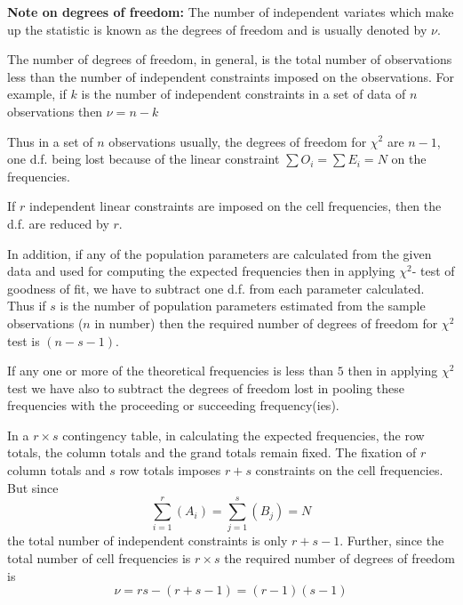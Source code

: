 \documentclass[oneside,11pt,pdftex]{book}%
\numberwithin{equation}{section}
\numberwithin{section}{chapter}
\numberwithin{equation}{chapter}
\begin{document}
\textbf{Note on degrees of freedom:} The number of independent variates which make up the statistic is known as the degrees of freedom and is usually denoted by $ \nu $.

The number of degrees of freedom, in general, is the total number of observations less than the number of independent constraints imposed on the observations. For example, if $ k $ is the number of independent constraints in a set of data of $ n $ observations then $ \nu=n-k $

Thus in a set of $ n $ observations usually, the degrees of freedom for $ \chi^2 $ are $ n-1 $, one d.f. being lost because of the linear constraint $ \sum O_i=\sum E_i=N $ on the frequencies.

If $ r $ independent linear constraints are imposed on the cell frequencies, then the d.f. are reduced by $ r $.

In addition, if any of the population parameters are calculated from the given data and used for computing the expected frequencies then in applying $ \chi^2 $- test of goodness of fit, we have to subtract one d.f. from each parameter calculated. Thus if $ s $ is the number of population parameters estimated from the sample observations ($ n $ in number) then the required number of degrees of freedom for $ \chi^2 $ test is $ (n-s-1) $.

If any one or more of the theoretical frequencies is less than $ 5 $ then in applying $ \chi^2 $ test we have also to subtract the degrees of freedom lost in pooling these frequencies with the proceeding or succeeding frequency(ies).

In a $ r \times s $ contingency table, in calculating the expected frequencies, the row totals, the column totals and the grand totals remain fixed. The fixation of $ r $ column totals and $ s $ row totals imposes $ r+s $ constraints on the cell frequencies. But since 
\[ \sum_{i=1}^r (A_i)=\sum_{j=1}^s (B_j)=N\]
the total number of independent constraints is only $ r+s-1 $. Further, since the total number of cell frequencies is $ r \times s $ the required number of degrees of freedom is \[ \nu=rs-(r+s-1)=(r-1)(s-1)\]
\end{document}
